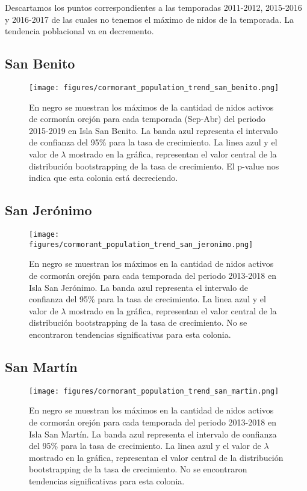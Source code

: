 \documentclass{article} %
\begin{document}
Descartamos los puntos correspondientes a las temporadas 2011-2012, 2015-2016 y 2016-2017 de las cuales no tenemos el máximo de nidos de la temporada. La tendencia poblacional va en decremento.

\subsection*{San Benito}

\begin{figure}[H]
\hspace{-2cm}
    \texttt{[image: figures/cormorant\_population\_trend\_san\_benito.png]}
\caption{En negro se muestran los máximos de la cantidad de nidos activos de cormorán orejón para cada temporada (Sep-Abr) del periodo 2015-2019 en Isla San Benito. La banda azul representa el intervalo de confianza del 95\% para la tasa de crecimiento. La linea azul y el valor de $\lambda$ mostrado en la gráfica, representan el valor central de la distribución bootstrapping de la tasa de crecimiento. El p-value nos indica que esta colonia está decreciendo.}
\end{figure}

\subsection*{San Jerónimo}

\begin{figure}[H]
\hspace{-2cm}
    \texttt{[image: figures/cormorant\_population\_trend\_san\_jeronimo.png]}
\caption{En negro se muestran los máximos en la cantidad de nidos activos de cormorán orejón para cada temporada del periodo 2013-2018 en Isla San Jerónimo. La banda azul representa el intervalo de confianza del 95\% para la tasa de crecimiento. La linea azul y el valor de $\lambda$ mostrado en la gráfica, representan el valor central de la distribución bootstrapping de la tasa de crecimiento. No se encontraron tendencias significativas para esta colonia.}
\end{figure}

\subsection*{San Martín}

\begin{figure}[H]
\hspace{-2cm}
    \texttt{[image: figures/cormorant\_population\_trend\_san\_martin.png]}
\caption{En negro se muestran los máximos en la cantidad de nidos activos de cormorán orejón para cada temporada del periodo 2013-2018 en Isla San Martín. La banda azul representa el intervalo de confianza del 95\% para la tasa de crecimiento. La linea azul y el valor de $\lambda$ mostrado en la gráfica, representan el valor central de la distribución bootstrapping de la tasa de crecimiento. No se encontraron tendencias significativas para esta colonia.}
\end{figure}
\end{document}
